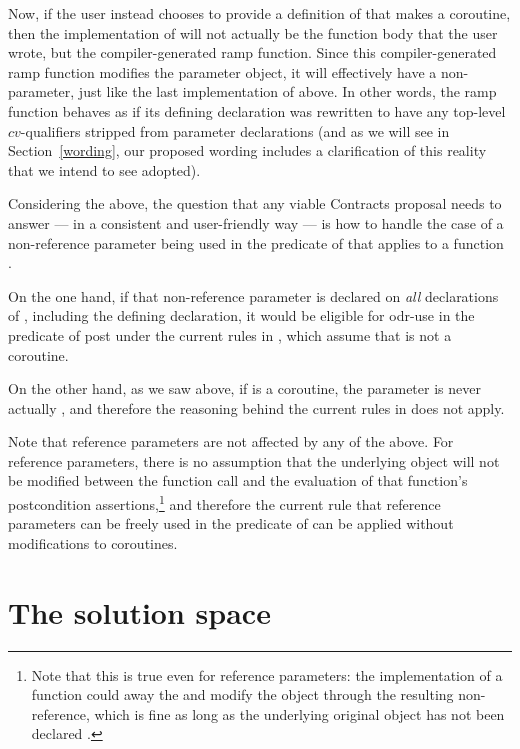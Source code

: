 Now, if the user instead chooses to provide a definition of  that makes  a coroutine, then the implementation of  will not actually be the function body that the user wrote, but the compiler-generated ramp function. Since this compiler-generated ramp function modifies the parameter object, it will effectively have a non-  parameter, just like the last implementation of  above. In other words, the ramp function behaves as if its defining declaration was rewritten to have any top-level $cv$-qualifiers stripped from parameter declarations (and as we will see in Section~\ref{wording}, our proposed wording includes a clarification of this reality that we intend to see adopted).

Considering the above, the question that any viable Contracts proposal needs to answer --- in a consistent and user-friendly way --- is how to handle the case of a non-reference parameter being used in the predicate of  that applies to a function .

On the one hand, if that non-reference parameter is declared  on \emph{all} declarations of , including the defining declaration, it would be eligible for odr-use in the predicate of post under the current rules in \cite{P2900R8}, which assume that  is not a coroutine.

On the other hand, as we saw above, if  is a coroutine, the parameter is never actually , and therefore the reasoning behind the current rules in \cite{P2900R8} does not apply. 

Note that reference parameters are not affected by any of the above. For reference parameters, there is no assumption that the underlying object will not be modified between the function call and the evaluation of that function's postcondition assertions,\footnote{Note that this is true even for  reference parameters: the implementation of a function could  away the  and modify the object through the resulting non- reference, which is fine as long as the underlying original object has not been declared .} and therefore the current rule that reference parameters can be freely used in the predicate of  can be applied without modifications to coroutines.

\section{The solution space}
\label{solutions}

